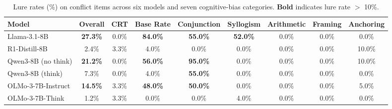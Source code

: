 

\begin{table}[t]
\centering
\caption{Lure rates (\%) on conflict items across six models and seven cognitive-bias categories. \textbf{Bold} indicates lure rate $>$ 10\%.}
\label{tab:behavioral}
\small
\setlength{\tabcolsep}{4pt}
\begin{tabular}{l c c c c c c c c}
\toprule
Model & Overall & CRT & Base Rate & Conjunction & Syllogism & Arithmetic & Framing & Anchoring \\
\midrule
Llama-3.1-8B & \textbf{27.3\%} & 0.0\% & \textbf{84.0\%} & \textbf{55.0\%} & \textbf{52.0\%} & 0.0\% & 0.0\% & 0.0\% \\
R1-Distill-8B & 2.4\% & 3.3\% & 4.0\% & 0.0\% & 0.0\% & 0.0\% & 0.0\% & 10.0\% \\
Qwen3-8B {\small(no think)} & \textbf{21.2\%} & 0.0\% & \textbf{56.0\%} & \textbf{95.0\%} & 0.0\% & 0.0\% & 0.0\% & 10.0\% \\
Qwen3-8B {\small(think)} & 7.3\% & 0.0\% & 4.0\% & \textbf{55.0\%} & 0.0\% & 0.0\% & 0.0\% & 0.0\% \\
OLMo-3-7B-Instruct & \textbf{14.5\%} & 3.3\% & \textbf{48.0\%} & \textbf{50.0\%} & 0.0\% & 0.0\% & 0.0\% & 5.0\% \\
OLMo-3-7B-Think & 1.2\% & 3.3\% & 0.0\% & 0.0\% & 4.0\% & 0.0\% & 0.0\% & 0.0\% \\
\bottomrule
\end{tabular}
\end{table}


